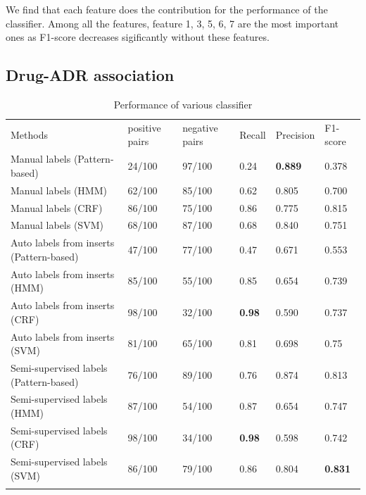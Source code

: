 We find that each feature does the contribution for the performance of the classifier. Among all the features, feature 1, 3, 5, 6, 7 are the most important ones as F1-score decreases sigificantly without these features.

\subsection{Drug-ADR association}
\label{subsec:3.3}

\begin{table}
	\centering
	\caption{Performance of various classifier}
	\label{tab:4}       %
	\begin{tabular}{m{3cm}m{1.2cm}m{1.2cm}m{1.2cm}m{1.2cm}m{1.2cm}}
		\hline\noalign{\smallskip}
		Methods & positive pairs & negative pairs & Recall & Precision & F1-score \\
		\noalign{\smallskip}\hline\noalign{\smallskip}
		Manual labels (Pattern-based) & 24/100 & 97/100 & 0.24 & \textbf{0.889} & 0.378 \\
		Manual labels (HMM) & 62/100 & 85/100 & 0.62 & 0.805 & 0.700 \\
		Manual labels (CRF) & 86/100 & 75/100 & 0.86 & 0.775 & 0.815 \\
		Manual labels (SVM) & 68/100 & 87/100 & 0.68 & 0.840 & 0.751 \\
		Auto labels from inserts (Pattern-based) & 47/100 & 77/100 & 0.47 & 0.671 & 0.553 \\
		Auto labels from inserts (HMM) & 85/100 & 55/100 & 0.85 & 0.654 & 0.739 \\
		Auto labels from inserts (CRF) & 98/100 & 32/100 & \textbf{0.98} & 0.590 & 0.737 \\ 
		Auto labels from inserts (SVM) & 81/100 & 65/100 & 0.81 & 0.698 & 0.75 \\
		Semi-supervised labels (Pattern-based) & 76/100 & 89/100 & 0.76 & 0.874 & 0.813 \\
		Semi-supervised labels (HMM) & 87/100 & 54/100 & 0.87 & 0.654 & 0.747 \\
		Semi-supervised labels (CRF) & 98/100 & 34/100 & \textbf{0.98} & 0.598 & 0.742 \\
		Semi-supervised labels (SVM) & 86/100 & 79/100 & 0.86 & 0.804 & \textbf{0.831} \\	 
		\noalign{\smallskip}\hline
	\end{tabular}
\end{table}

